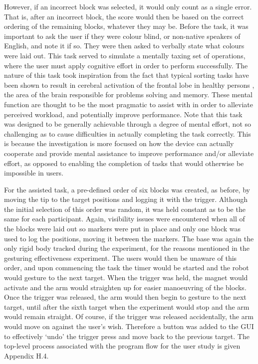 \documentclass[11pt]{article}
\begin{document}
However, if an incorrect block was selected, it would only count as a single error. That is, after an incorrect block, the score would then be based on the correct ordering of the remaining blocks, whatever they may be. Before the task, it was important to ask the user if they were colour blind, or non-native speakers of English, and note it if so. They were then asked to verbally state what colours were laid out. This task served to simulate a mentally taxing set of operations, where the user must apply cognitive effort in order to perform successfully. The nature of this task took inspiration from the fact that typical sorting tasks have been shown to result in cerebral activation of the frontal lobe in healthy persons \cite{volz1997}, the area of the brain responsible for problems solving and memory. These mental function are thought to be the most pragmatic to assist with in order to alleviate perceived workload, and potentially improve performance. Note that this task was designed to be generally achievable through a degree of mental effort, not so challenging as to cause difficulties in actually completing the task correctly. This is because the investigation is more focused on how the device can actually cooperate and provide mental assistance to improve performance and/or alleviate effort, as opposed to enabling the completion of tasks that would otherwise be impossible in users.

For the assisted task, a pre-defined order of six blocks was created, as before, by moving the tip to the target positions and logging it with the trigger. Although the initial selection of this order was random, it was held constant as to be the same for each participant. Again, visibility issues were encountered when all of the blocks were laid out so markers were put in place and only one block was used to log the positions, moving it between the markers. The base was again the only rigid body tracked during the experiment, for the reasons mentioned in the gesturing effectiveness experiment. The users would then be unaware of this order, and upon commencing the task the timer would be started and the robot would gesture to the next target. When the trigger was held, the magnet would activate and the arm would straighten up for easier manoeuvring of the blocks. Once the trigger was released, the arm would then begin to gesture to the next target, until after the sixth target when the experiment would stop and the arm would remain straight. Of course, if the trigger was released accidentally, the arm would move on against the user's wish. Therefore a button was added to the GUI to effectively `undo' the trigger press and move back to the previous target. The top-level process associated with the program flow for the user study is given Appendix H.4.
\end{document}
